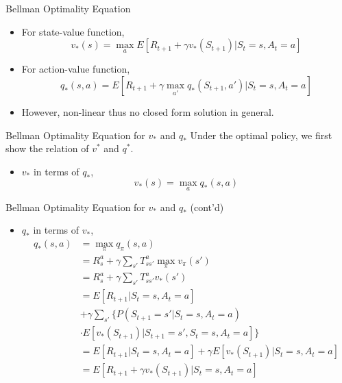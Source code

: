 \documentclass{beamer}
\begin{document}
\begin{frame}{Bellman Optimality Equation}
    \begin{itemize}
        \item For state-value function,
        \[
        v_*(s) = \max_a E[R_{t+1} + \gamma v_*(S_{t+1})|S_t=s, A_t=a]
        \]
        
        \item For action-value function,
        \[
        q_*(s,a) 
        = E[R_{t+1} + \gamma \max_{a'}q_*(S_{t+1}, a') |S_t=s, A_t=a]
        \]
        \item \alert{However,} non-linear thus no closed form solution in general.
    \end{itemize}
\end{frame}


\begin{frame}{Bellman Optimality Equation for $v_*$ and $q_*$}
    Under the optimal policy, we first show the relation of $v^*$ and $q^*$.
    \begin{itemize}
        \item $v_*$ in terms of $q_*$,
        \[
        v_*(s) = \max_a q_*(s,a)
        \]
        
    \end{itemize}
\end{frame}

\begin{frame}{Bellman Optimality Equation for $v_*$ and $q_*$ (cont'd)}
    \begin{itemize}
        \item $q_*$ in terms of $v_*$,
        \[
        \begin{split}
             q_*(s,a) &= \max_\pi q_\pi(s,a) \\
             & = R_s^a + \gamma \sum_{s'}T^a_{ss'} \max_\pi v_\pi(s') \\
             & = R_s^a + \gamma \sum_{s'}T^a_{ss'}v_*(s') \\
             & = E[R_{t+1}|S_t=s, A_t=a] \\
             & + \gamma \sum_{s'} \{ P(S_{t+1}=s'|S_t=s, A_t=a) \\
             & \cdot E[v_*(S_{t+1})|S_{t+1}=s', S_t=s, A_t=a] \} \\
             & = E[R_{t+1}|S_t=s, A_t=a] + \gamma E[v_*(S_{t+1})|S_t=s, A_t=a] \\
             & = E[R_{t+1} + \gamma v_*(S_{t+1})|S_t=s, A_t=a]
        \end{split}
        \]  
    \end{itemize}
\end{frame}
\end{document}

